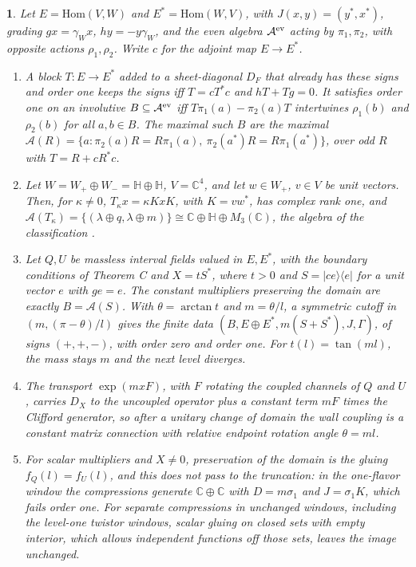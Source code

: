 \documentclass[aps,prd,reprint,onecolumn,nofootinbib,amsmath,amssymb,floatfix]{revtex4-2}
\theoremstyle{plain}
\newcommand{\resultname}{}
\newtheorem*{resultenv}{\resultname}
\newenvironment{result}[1]{\renewcommand{\resultname}{#1}\begin{resultenv}}{\end{resultenv}}
\newcommand{\C}{\mathbb C}
\renewcommand{\H}{\mathbb H}
\begin{document}
\begin{result}{Proposition I}
Let $E=\mathrm{Hom}(V,W)$ and $E^*=\mathrm{Hom}(W,V)$, with $J(x,y)=(y^*,x^*)$, grading $gx=\gamma_Wx$, $hy=-y\gamma_W$, and the even algebra $\mathcal A^{\rm ev}$ acting by $\pi_1,\pi_2$, with opposite actions $\rho_1,\rho_2$. Write $c$ for the adjoint map $E\to E^*$.
\begin{enumerate}
\item A block $T:E\to E^*$ added to a sheet-diagonal $D_F$ that already has these signs and order one keeps the signs iff $T=cT^*c$ and $hT+Tg=0$. It satisfies order one on an involutive $B\subseteq\mathcal A^{\rm ev}$ iff $T\pi_1(a)-\pi_2(a)T$ intertwines $\rho_1(b)$ and $\rho_2(b)$ for all $a,b\in B$. The maximal such $B$ are the maximal $\mathcal A(R)=\{a:\pi_2(a)R=R\pi_1(a),\ \pi_2(a^*)R=R\pi_1(a^*)\}$, over odd $R$ with $T=R+cR^*c$.
\item Let $W=W_+\oplus W_-=\H\oplus\H$, $V=\C^4$, and let $w\in W_+$, $v\in V$ be unit vectors. Then, for $\kappa\neq0$, $T_\kappa x=\kappa KxK$, with $K=vw^*$, has complex rank one, and $\mathcal A(T_\kappa)=\{(\lambda\oplus q,\lambda\oplus m)\}\cong\C\oplus\H\oplus M_3(\C)$, the algebra of the classification \cite{CC2008}.
\item Let $Q,U$ be massless interval fields valued in $E,E^*$, with the boundary conditions of Theorem C and $X=tS^*$, where $t>0$ and $S=|ce\rangle\langle e|$ for a unit vector $e$ with $ge=e$. The constant multipliers preserving the domain are exactly $B=\mathcal A(S)$. With $\theta=\arctan t$ and $m=\theta/l$, a symmetric cutoff in $(m,(\pi-\theta)/l)$ gives the finite data $(B,E\oplus E^*,m(S+S^*),J,\Gamma)$, of signs $(+,+,-)$, with order zero and order one. For $t(l)=\tan(ml)$, the mass stays $m$ and the next level diverges.
\item The transport $\exp(mxF)$, with $F$ rotating the coupled channels of $Q$ and $U$, carries $D_X$ to the uncoupled operator plus a constant term $mF$ times the Clifford generator, so after a unitary change of domain the wall coupling is a constant matrix connection with relative endpoint rotation angle $\theta=ml$.
\item For scalar multipliers and $X\neq0$, preservation of the domain is the gluing $f_Q(l)=f_U(l)$, and this does not pass to the truncation: in the one-flavor window the compressions generate $\C\oplus\C$ with $D=m\sigma_1$ and $J=\sigma_1K$, which fails order one. For separate compressions in unchanged windows, including the level-one twistor windows, scalar gluing on closed sets with empty interior, which allows independent functions off those sets, leaves the image unchanged.
\end{enumerate}
\end{result}
\end{document}
